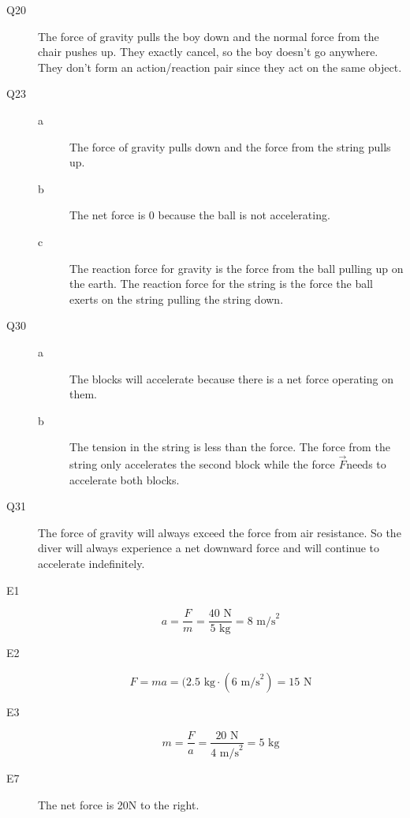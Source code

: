 \documentclass{exam}
\begin{document}
\begin{description}

\item[Q20]
The force of gravity pulls the boy down and the normal force from the chair pushes up.  They exactly cancel, so the boy
doesn't go anywhere.  They don't form an action/reaction pair since they act on the same object.

\item[Q23]
\begin{description}
\item[a]
The force of gravity pulls down and the force from the string pulls up.

\item[b]
The net force is 0 because the ball is not accelerating.

\item[c]
The reaction force for gravity is the force from the ball pulling up on the earth.  The reaction force for the string is
the force the ball exerts on the string pulling the string down.

\end{description}

\item[Q30]
\begin{description}
\item[a] The blocks will accelerate because there is a net force operating on them.
\item[b] The tension in the string is less than the force.  The force from the string only accelerates the second block
  while the force $\vec{F}$needs to accelerate both blocks.
\end{description}

\item[Q31]
The force of gravity will always exceed the force from air resistance.  So the diver will always experience a net
downward force and will continue to accelerate indefinitely.

\item[E1]
\[
  a = \frac{F}{m} = \frac{40 \text{ N}}{5 \text{ kg}} = 8 \text{ m/s}^2
\]

\item[E2]
\[
  F = ma = (2.5 \text{ kg} \cdot (6 \text{ m/s}^2) = 15 \text{ N}
\]

\item[E3]
\[
  m = \frac{F}{a} = \frac{20 \text{ N}}{4 \text{ m/s}^2} = 5 \text{ kg}
\]

\item[E7]
The net force is 20N to the right.


\end{description}
\end{document}
